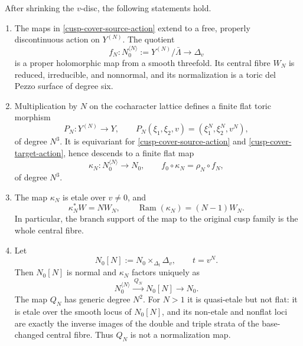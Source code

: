 \begin{theorem}
\label{cusp-cover-extension-theorem}
\mbox{\Verified}\ 
After shrinking the $v$-disc, the following statements hold.

\begin{enumerate}
\item The maps in \eqref{cusp-cover-source-action} extend to a free,
properly discontinuous action on $Y^{(N)}$.  The quotient
\[
 f_N\colon N_0^{\langle N\rangle}
 :=Y^{(N)}/\bar\Lambda\longrightarrow\Delta_v
\]
is a proper holomorphic map from a smooth threefold.  Its central fibre
$W_N$ is reduced, irreducible, and nonnormal, and its normalization is a
toric del Pezzo surface of degree six.

\item Multiplication by $N$ on the cocharacter lattice defines a finite
flat toric morphism
\begin{equation}
 P_N\colon Y^{(N)}\longrightarrow Y,\qquad
 P_N(\xi_1,\xi_2,v)=(\xi_1^N,\xi_2^N,v^N),
 \label{cusp-cover-toric-power-map}
\end{equation}
of degree $N^3$.  It is equivariant for
\eqref{cusp-cover-source-action} and
\eqref{cusp-cover-target-action}, hence descends to a finite flat map
\begin{equation}
 \kappa_N\colon N_0^{\langle N\rangle}\longrightarrow N_0,
 \qquad f_0\circ\kappa_N=\rho_N\circ f_N,
 \label{cusp-cover-completed-map}
\end{equation}
of degree $N^3$.

\item The map $\kappa_N$ is etale over $v\ne0$, and
\begin{equation}
 \kappa_N^*W=NW_N,
 \qquad
 \operatorname{Ram}(\kappa_N)=(N-1)W_N.
 \label{cusp-cover-direct-ramification}
\end{equation}
In particular, the branch support of the map to the original cusp family
is the whole central fibre.

\item Let
\begin{equation}
 N_0[N]:=N_0\times_{\Delta_t}\Delta_v,
 \qquad t=v^N.
 \label{cusp-cover-base-changed-target}
\end{equation}
Then $N_0[N]$ is normal and $\kappa_N$ factors uniquely as
\begin{equation}
 N_0^{\langle N\rangle}
 \xrightarrow{\ Q_N\ }N_0[N]
 \longrightarrow N_0.
 \label{cusp-cover-relative-factorization}
\end{equation}
The map $Q_N$ has generic degree $N^2$.  For $N>1$ it is quasi-etale but
not flat: it is etale over the smooth locus of $N_0[N]$, and its non-etale
and nonflat loci are exactly the inverse images of the double and triple
strata of the base-changed central fibre.  Thus $Q_N$ is not a
normalization map.


\end{enumerate}
\end{theorem}
